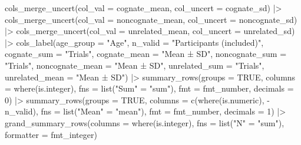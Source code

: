 \documentclass[
  letterpaper,
  DIV=11,
  numbers=noendperiod]{scrartcl}
\newenvironment{Shaded}{\begin{snugshade}}{\end{snugshade}}
\newcommand{\AttributeTok}[1]{\textcolor[rgb]{0.40,0.45,0.13}{#1}}
\newcommand{\ConstantTok}[1]{\textcolor[rgb]{0.56,0.35,0.01}{#1}}
\newcommand{\DecValTok}[1]{\textcolor[rgb]{0.68,0.00,0.00}{#1}}
\newcommand{\FunctionTok}[1]{\textcolor[rgb]{0.28,0.35,0.67}{#1}}
\newcommand{\NormalTok}[1]{\textcolor[rgb]{0.00,0.23,0.31}{#1}}
\newcommand{\OtherTok}[1]{\textcolor[rgb]{0.00,0.23,0.31}{#1}}
\newcommand{\SpecialCharTok}[1]{\textcolor[rgb]{0.37,0.37,0.37}{#1}}
\newcommand{\StringTok}[1]{\textcolor[rgb]{0.13,0.47,0.30}{#1}}
\begin{document}
\begin{Shaded}
\begin{Highlighting}[]
    \FunctionTok{cols\_merge\_uncert}\NormalTok{(}\AttributeTok{col\_val =}\NormalTok{ cognate\_mean,}
                      \AttributeTok{col\_uncert =}\NormalTok{ cognate\_sd) }\SpecialCharTok{|\textgreater{}} 
    \FunctionTok{cols\_merge\_uncert}\NormalTok{(}\AttributeTok{col\_val =}\NormalTok{ noncognate\_mean,}
                      \AttributeTok{col\_uncert =}\NormalTok{ noncognate\_sd) }\SpecialCharTok{|\textgreater{}} 
    \FunctionTok{cols\_merge\_uncert}\NormalTok{(}\AttributeTok{col\_val =}\NormalTok{ unrelated\_mean, }
                      \AttributeTok{col\_uncert =}\NormalTok{ unrelated\_sd) }\SpecialCharTok{|\textgreater{}} 
    \FunctionTok{cols\_label}\NormalTok{(}\AttributeTok{age\_group =} \StringTok{"Age"}\NormalTok{,}
               \AttributeTok{n\_valid =} \StringTok{"Participants (included)"}\NormalTok{,}
               \AttributeTok{cognate\_sum =} \StringTok{"Trials"}\NormalTok{,}
               \AttributeTok{cognate\_mean =} \StringTok{"Mean ± SD"}\NormalTok{,}
               \AttributeTok{noncognate\_sum =} \StringTok{"Trials"}\NormalTok{,}
               \AttributeTok{noncognate\_mean =} \StringTok{"Mean ± SD"}\NormalTok{,}
               \AttributeTok{unrelated\_sum =} \StringTok{"Trials"}\NormalTok{,}
               \AttributeTok{unrelated\_mean =} \StringTok{"Mean ± SD"}\NormalTok{) }\SpecialCharTok{|\textgreater{}} 
    \FunctionTok{summary\_rows}\NormalTok{(}\AttributeTok{groups =} \ConstantTok{TRUE}\NormalTok{,}
                 \AttributeTok{columns =} \FunctionTok{where}\NormalTok{(is.integer),}
                 \AttributeTok{fns =} \FunctionTok{list}\NormalTok{(}\StringTok{"Sum"} \OtherTok{=} \StringTok{"sum"}\NormalTok{),}
                 \AttributeTok{fmt =}\NormalTok{ fmt\_number,}
                 \AttributeTok{decimals =} \DecValTok{0}\NormalTok{) }\SpecialCharTok{|\textgreater{}}
    \FunctionTok{summary\_rows}\NormalTok{(}\AttributeTok{groups =} \ConstantTok{TRUE}\NormalTok{,}
                 \AttributeTok{columns =} \FunctionTok{c}\NormalTok{(}\FunctionTok{where}\NormalTok{(is.numeric), }\SpecialCharTok{{-}}\NormalTok{n\_valid),}
                 \AttributeTok{fns =} \FunctionTok{list}\NormalTok{(}\StringTok{"Mean"} \OtherTok{=} \StringTok{"mean"}\NormalTok{),}
                 \AttributeTok{fmt =}\NormalTok{ fmt\_number,}
                 \AttributeTok{decimals =} \DecValTok{1}\NormalTok{) }\SpecialCharTok{|\textgreater{}}
    \FunctionTok{grand\_summary\_rows}\NormalTok{(}\AttributeTok{columns =} \FunctionTok{where}\NormalTok{(is.integer),}
                       \AttributeTok{fns =} \FunctionTok{list}\NormalTok{(}\StringTok{"N"} \OtherTok{=} \StringTok{"sum"}\NormalTok{),}
                       \AttributeTok{formatter =}\NormalTok{ fmt\_integer) }
\end{Highlighting}
\end{Shaded}
\end{document}
